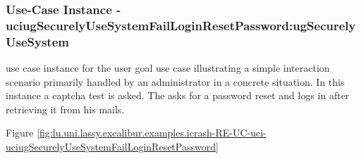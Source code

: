 
	\subsubsection{Use-Case Instance - uciugSecurelyUseSystemFailLoginResetPassword:ugSecurelyUseSystem}
	
	use case instance for the user goal use case  illustrating a simple interaction scenario primarily handled by an administrator in a concrete situation.
	In this instance a captcha test is asked. The  asks for a password reset and logs in after retrieving it from his mails.
	\begin{operationmodel}
	
	\end{operationmodel} 

	
	Figure \ref{fig:lu.uni.lassy.excalibur.examples.icrash-RE-UC-uci-uciugSecurelyUseSystemFailLoginResetPassword}
	
